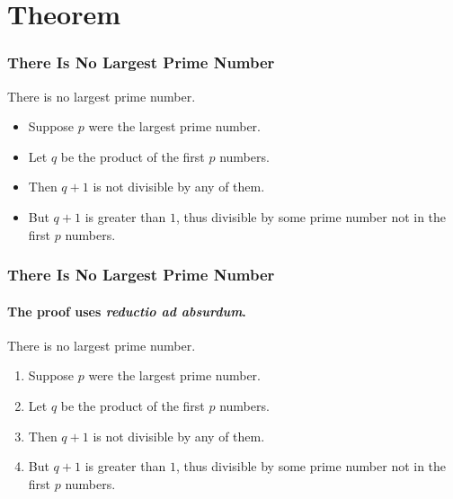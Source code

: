 \documentclass[aspectratio=169]{beamer}
\begin{document}
\section{Theorem}

\begin{frame} 
    \frametitle{There Is No Largest Prime Number} 
    \begin{theorem}
    There is no largest prime number. \end{theorem} 
    \begin{itemize} 
        \item Suppose $p$ were the largest prime number. 
        \item Let $q$ be the product of the first $p$ numbers. 
        \item Then $q+1$ is not divisible by any of them. 
        \item But $q + 1$ is greater than $1$, thus divisible by some prime
        number not in the first $p$ numbers.
    \end{itemize}
\end{frame}

\begin{frame} 
    \frametitle{There Is No Largest Prime Number} 
    \framesubtitle{The proof uses \textit{reductio ad absurdum}.} 
    \begin{theorem}
    There is no largest prime number. \end{theorem} 
    \begin{enumerate} 
    \item<1-| alert@1> Suppose $p$ were the largest prime number. 
    \item<2-> Let $q$ be the product of the first $p$ numbers. 
    \item<2-> Then $q+1$ is not divisible by any of them. 
    \item<1-> But $q + 1$ is greater than $1$, thus divisible by some prime
    number not in the first $p$ numbers.
    \end{enumerate}
\end{frame}
    
\end{document}
